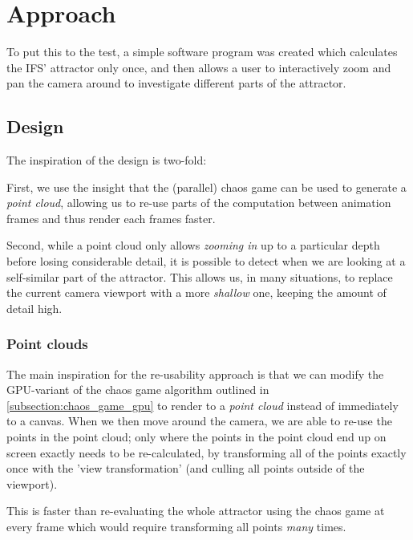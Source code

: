 \documentclass[11pt]{article}
\begin{document}

\section{Approach}
\label{sec:orgb20be57}
\label{section:approach}

To put this to the test, a simple software program was created which calculates the IFS' attractor only once,
and then allows a user to interactively zoom and pan the camera around to investigate different parts of the attractor.

\subsection{Design}
\label{sec:org1734547}

The inspiration of the design is two-fold:

First, we use the insight that the (parallel) chaos game can be used to generate a \emph{point cloud}, allowing us to re-use parts of the computation between animation frames
and thus render each frames faster.

Second, while a point cloud only allows \emph{zooming in} up to a particular depth before losing considerable detail, 
it is possible to detect when we are looking at a self-similar part of the attractor.
This allows us, in many situations, to replace the current camera viewport with a more \emph{shallow} one, keeping the amount of detail high.

\subsubsection{Point clouds}
\label{sec:org0350409}

The main inspiration for the re-usability approach is that we can modify the GPU-variant of the chaos game algorithm outlined in \autoref{subsection:chaos_game_gpu}
to render to a \emph{point cloud} instead of immediately to a canvas.
When we then move around the camera, we are able to re-use the points in the point cloud;
only where the points in the point cloud end up on screen exactly needs to be re-calculated, 
by transforming all of the points exactly once with the 'view transformation' 
(and culling all points outside of the viewport).

This is faster than re-evaluating the whole attractor using the chaos game at every frame which would require transforming all points \emph{many} times.
\end{document}
